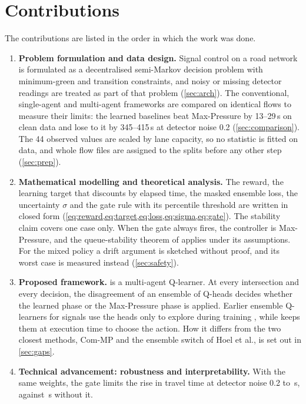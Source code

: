 \section{Contributions}

The contributions are listed in the order in which the work was done.
\begin{enumerate}
\item \textbf{Problem formulation and data design.} Signal control on a road network is
formulated as a decentralised semi-Markov decision problem with minimum-green and transition
constraints, and noisy or missing detector readings are treated as part of that problem
(\cref{sec:arch}). The conventional, single-agent and multi-agent frameworks are compared on
identical flows to measure their limits: the learned baselines beat Max-Pressure by
13--29\,s on clean data and lose to it by 345--415\,s at detector noise 0.2
(\cref{sec:comparison}). The 44 observed values are scaled by lane capacity, so no statistic
is fitted on data, and whole flow files are assigned to the splits before any other step
(\cref{sec:prep}).
\item \textbf{Mathematical modelling and theoretical analysis.} The reward, the learning
target that discounts by elapsed time, the masked ensemble loss, the uncertainty $\sigma$ and
the gate rule with its percentile threshold are written in closed form
(\cref{eq:reward,eq:target,eq:loss,eq:sigma,eq:gate}). The stability claim covers one case only.
When the gate always fires, the controller is Max-Pressure, and the queue-stability theorem of
\citet{varaiya2013max} applies under its assumptions. For the mixed policy a drift argument
is sketched without proof, and its worst case is measured instead (\cref{sec:safety}).
\item \textbf{Proposed framework.} \ugmarl{} is a multi-agent Q-learner. At every
intersection and every decision, the disagreement of an ensemble of Q-heads decides whether
the learned phase or the Max-Pressure phase is applied. Earlier ensemble Q-learners for
signals use the heads only to explore during training \citep{tan2020multiagent}, while
\ugmarl{} keeps them at execution time to choose the action. How it differs from the two
closest methods, Com-MP and the ensemble switch of Hoel et al., is set out in
\cref{sec:gaps}.
\item \textbf{Technical advancement: robustness and interpretability.} With the same weights,
the gate limits the rise in travel time at detector noise 0.2 to
\,s, against \,s without it.

\end{enumerate}
